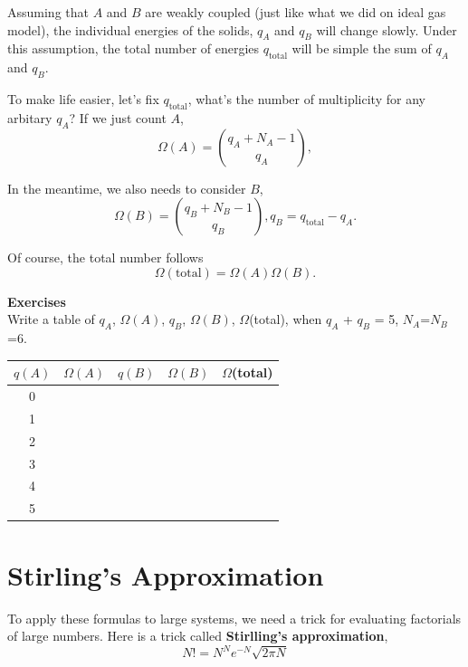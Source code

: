 \documentclass[twoside]{article}
\begin{document}
Assuming that $A$ and $B$ are weakly coupled (just like what we did on ideal gas model),
the individual energies of the solids, $q_A$ and $q_B$ will change slowly.
Under this assumption, the total number of energies $q_\text {total}$ will be simple the sum of $q_A$ and $q_B$.

To make life easier, let's fix $q_\text{total}$, what's the number of multiplicity for any arbitary $q_A$?
If we just count $A$,
\begin{equation}
 \Omega(A) = \binom{q_A+N_A-1}{q_A},
\end{equation}

In the meantime, we also needs to consider $B$, 
\begin{equation}
 \Omega(B) = \binom{q_B+N_B-1}{q_B},
 q_B = q_ \text {total} - q_A.
\end{equation}

Of course, the total number follows
\begin{equation}
 \Omega(\text {total}) = \Omega(A)\Omega(B).
\end{equation}

{\bf Exercises}\\
Write a table of $q_A$, $\Omega(A)$, $q_B$, $\Omega(B)$, $\Omega$(total), when $q_A$ + $q_B$ = 5, $N_A$=$N_B$=6.

\begin{table}[h]
\centering
\begin{tabular}{|c| c |c |c |c|}\hline
$q(A)$ & $\Omega(A)$ & $q(B)$ & $\Omega(B)$ & $\Omega$(total)\\\hline
    0  &             &        &             &  \\\hline
    1  &             &        &             &  \\\hline
    2  &             &        &             &  \\\hline
    3  &             &        &             &  \\\hline
    4  &             &        &             &  \\\hline
    5  &             &        &             &  \\\hline
\end{tabular}
\end{table}

\section{Stirling's Approximation}
To apply these formulas to large systems, we need a trick for evaluating factorials of large numbers. Here is a trick called {\bf Stirlling's approximation},
\begin{equation}\label{stir}
  N! = N^N e^{-N} \sqrt{2\pi N}
\end{equation}
\end{document}
